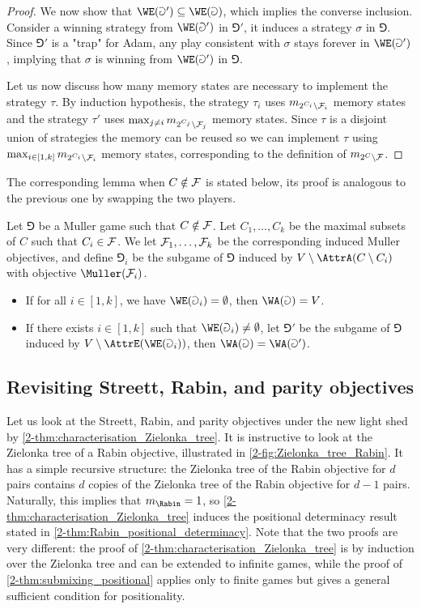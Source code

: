 \begin{proof}
We now show that $\WE(\Game') \subseteq \WE(\Game)$, which implies the converse inclusion.
Consider a winning strategy from $\WE(\Game')$ in $\Game'$, it induces a strategy $\sigma$ in $\Game$.
Since $\Game'$ is a "trap" for Adam, any play consistent with $\sigma$ stays forever in $\WE(\Game')$, 
implying that $\sigma$ is winning from $\WE(\Game')$ in $\Game$.

Let us now discuss how many memory states are necessary to implement the strategy $\tau$.
By induction hypothesis, the strategy $\tau_i$ uses $m_{2^{C_i} \setminus \mathcal{F}_i}$ memory states
and the strategy $\tau'$ uses $\max_{j \neq i} m_{2^{C_j} \setminus \mathcal{F}_j}$ memory states.
Since $\tau$ is a disjoint union of strategies the memory can be reused so we can implement $\tau$ using $\max_{i \in [1,k]} m_{2^{C_i} \setminus \mathcal{F}_i}$ memory states, corresponding to the definition of $m_{2^C \setminus \mathcal{F}}$.
\end{proof}

The corresponding lemma when $C \notin \mathcal{F}$ is stated below, its proof is analogous to the previous one by swapping the two players.

\begin{lemma}\label{2-lem:McNaughton_Zielonka_odd}
Let $\Game$ be a Muller game such that $C \notin \mathcal{F}$.
Let $C_1, \dots, C_k$ be the maximal subsets of $C$ such that $C_i \in \mathcal{F}$.
We let $\mathcal{F}_1,\dots,\mathcal{F}_k$ be the corresponding induced Muller objectives,
and define $\Game_i$ be the subgame of $\Game$ induced by $V \setminus \AttrA(C \setminus C_i)$ with objective $\Muller(\F_i)$.
\begin{itemize}
	\item If for all $i \in [1,k]$, we have $\WE(\Game_i) = \emptyset$, then $\WA(\Game) = V$.
	\item If there exists $i \in [1,k]$ such that $\WE(\Game_i) \neq \emptyset$,
	let $\Game'$ be the subgame of $\Game$ induced by $V \setminus \AttrE( \WE(\Game_i) )$,
	then $\WA(\Game) = \WA(\Game')$.	
\end{itemize}
\end{lemma}

\subsection*{Revisiting Streett, Rabin, and parity objectives}
Let us look at the Streett, Rabin, and parity objectives under the new light shed by \cref{2-thm:characterisation_Zielonka_tree}.
It is instructive to look at the Zielonka tree of a Rabin objective, illustrated in \cref{2-fig:Zielonka_tree_Rabin}.
It has a simple recursive structure: the Zielonka tree of the Rabin objective for $d$ pairs contains $d$ copies
of the Zielonka tree of the Rabin objective for $d-1$ pairs.
Naturally, this implies that $m_{\Rabin} = 1$, so \cref{2-thm:characterisation_Zielonka_tree} induces the positional determinacy result
stated in \cref{2-thm:Rabin_positional_determinacy}.
Note that the two proofs are very different: the proof of \cref{2-thm:characterisation_Zielonka_tree} is by induction over the Zielonka tree and can be extended to infinite games, while the proof of \cref{2-thm:submixing_positional} applies only to finite games but gives a general sufficient condition for positionality.

